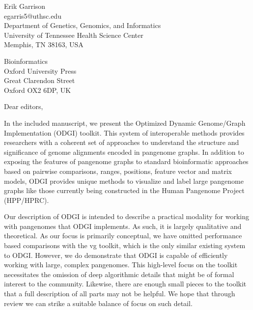 \documentclass[12pt,hidelinks,letterpaper]{article}
\begin{document}
\begin{flushright}
  Erik Garrison \\
  egarris5@uthsc.edu \\
  Department of Genetics, Genomics, and Informatics \\
  University of Tennessee Health Science Center \\
  Memphis, TN 38163, USA
\end{flushright}


\begin{flushleft}
  Bioinformatics \\
  Oxford University Press \\
  Great Clarendon Street \\
  Oxford OX2 6DP, UK
\end{flushleft}


Dear editors,

In the included manuscript, we present the Optimized Dynamic Genome/Graph Implementation (ODGI) toolkit.
This system of interoperable methods provides researchers with a coherent set of approaches to understand the structure and significance of genome alignments encoded in pangenome graphs.
In addition to exposing the features of pangenome graphs to standard bioinformatic approaches based on pairwise comparisons, ranges, positions, feature vector and matrix models, ODGI provides unique methods to visualize and label large pangenome graphs like those currently being constructed in the Human Pangenome Project (HPP/HPRC).

Our description of ODGI is intended to describe a practical modality for working with pangenomes that ODGI implements.
As such, it is largely qualitative and theoretical.
As our focus is primarily conceptual, we have omitted performance based comparisons with the vg toolkit, which is the only similar existing system to ODGI.
However, we do demonstrate that ODGI is capable of efficiently working with large, complex pangenomes.
This high-level focus on the toolkit necessitates the omission of deep algorithmic details that might be of formal interest to the community.
Likewise, there are enough small pieces to the toolkit that a full description of all parts may not be helpful.
We hope that through review we can strike a suitable balance of focus on such detail.
\end{document}
